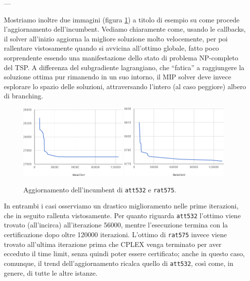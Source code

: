 ---

Mostriamo inoltre due immagini (figura \ref{fig:updatingincumbent}) a titolo di esempio su come procede l'aggiornamento dell'incumbent. Vediamo chiaramente come, usando le callbacks, il solver all'inizio aggiorna la migliore soluzione molto velocemente, per poi rallentare vistosamente quando si avvicina all'ottimo globale, fatto poco sorprendente essendo una manifestazione dello stato di problema NP-completo del TSP. A differenza del subgradiente lagrangiano, che ``fatica'' a raggiungere la soluzione ottima pur rimanendo in un suo intorno, il MIP solver deve invece esplorare lo spazio delle soluzioni, attraversando l'intero (al caso peggiore) albero di branching.

\begin{figure}
  \begin{center}
    \includegraphics[width=0.48\textwidth]{images/att532aggiornamento}
    \includegraphics[width=0.48\textwidth]{images/rat575aggiornamento}
    \caption{Aggiornamento dell'incumbent di \texttt{att532} e \texttt{rat575}.}
    \label{fig:updatingincumbent}
  \end{center}
\end{figure}

In entrambi i casi osserviamo un drastico miglioramento nelle prime iterazioni, che in seguito rallenta vistosamente. Per quanto riguarda \texttt{att532} l'ottimo viene trovato (all'incirca) all'iterazione 56000, mentre l'esecuzione termina con la certificazione dopo oltre 120000 iterazioni. L'ottimo di \texttt{rat575} invece viene trovato all'ultima iterazione prima che CPLEX venga terminato per aver ecceduto il time limit, senza quindi poter essere certificato; anche in questo caso, comunque, il trend dell'aggiornamento ricalca quello di \texttt{att532}, così come, in genere, di tutte le altre istanze. 

